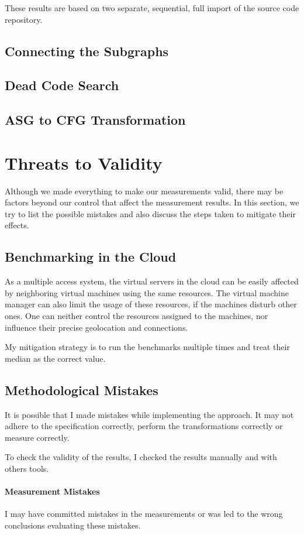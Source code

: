 These results are based on two separate, sequential, full import of the source code repository.

\subsection{Connecting the Subgraphs}


\subsection{Dead Code Search}


\subsection{ASG to CFG Transformation}


\section{Threats to Validity}
\label{sect:evaluation-threats}
Although we made everything to make our measurements valid, there may be factors beyond our control that affect the measurement results. In this section, we try to list the possible mistakes and also discuss the steps taken to mitigate their effects.

\subsection{Benchmarking in the Cloud} As a multiple access system, the virtual servers in the cloud can be easily affected by neighboring virtual machines using the same resources. The virtual machine manager can also limit the usage of these resources, if the machines disturb other ones. One can neither control the resources assigned to the machines, nor influence their precise geolocation and connections.

My mitigation strategy is to run the benchmarks multiple times and treat their median as the correct value.

\subsection{Methodological Mistakes} It is possible that I made mistakes while implementing the approach. It may not adhere to the specification correctly, perform the transformations correctly or measure correctly.

To check the validity of the results, I checked the results manually and with others tools.

\paragraph{Measurement Mistakes} I may have committed mistakes in the measurements or was led to the wrong conclusions evaluating these mistakes.

